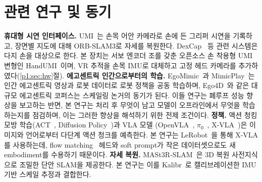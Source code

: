 \documentclass[conference,10pt]{IEEEtran}
\begin{document}
\section{관련 연구 및 동기}
\textbf{휴대형 시연 인터페이스.} UMI~\cite{chi2024umi}는 손목 어안 카메라로 손에 든 그리퍼 시연을 기록하고, 장면별 지도에 대해
ORB-SLAM3로 자세를 복원한다. DexCap~\cite{wang2024dexcap} 등 관련 시스템은 다지 손을 대상으로 한다. 본 장치는 서보 엔코더 조를 갖춘
오픈소스 손 착용형 UMI 변형인 HandUMI~\cite{handumi_hw}이며, VR 추적을 손목 IMU로 대체하고 고정 헤드 카메라를 추가하였다(\ref{p1:sec:hw}절).
\textbf{에고센트릭 인간으로부터의 학습.} EgoMimic~\cite{kareer2024egomimic}과 MimicPlay~\cite{wang2023mimicplay}는 인간 에고센트릭
영상과 로봇 데이터로 로봇 정책을 공동 학습하며, Ego4D~\cite{grauman2022ego4d}와 같은 대규모 에고센트릭 코퍼스는 스케일링 논거의
동기가 된다. 이들 연구는 폐루프 성능 향상을 보고하는 반면, 본 연구는 처리 후 무엇이 남고 모델이 오프라인에서 무엇을 학습하는지를
점검하며, 이는 그러한 향상을 해석하기 위한 전제 조건이다.
\textbf{정책.} 액션 청킹 모방 학습(ACT~\cite{zhao2023act}, Diffusion Policy~\cite{chi2023diffusion})과 VLA 모델
(OpenVLA~\cite{kim2024openvla}, $\pi_0$~\cite{black2024pi0}, X-VLA~\cite{zheng2025xvla})은 이미지와 언어로부터 다단계 액션 청크를
예측한다. 본 연구는 LeRobot~\cite{cadene2024lerobot}을 통해 X-VLA를 사용하는데, flow matching~\cite{lipman2023flow} 헤드와
soft prompt가 작은 데이터셋으로도 새 embodiment를 수용하기 때문이다.
\textbf{자세 복원.} MASt3R-SLAM~\cite{murai2025mast3rslam}은 3D 복원 사전지식으로 조밀한 단안 SLAM을 제공한다. 본 연구는 이를
Kalibr~\cite{furgale2013kalibr}로 캘리브레이션한 IMU 기반 스케일 추정과 결합한다.
\end{document}
